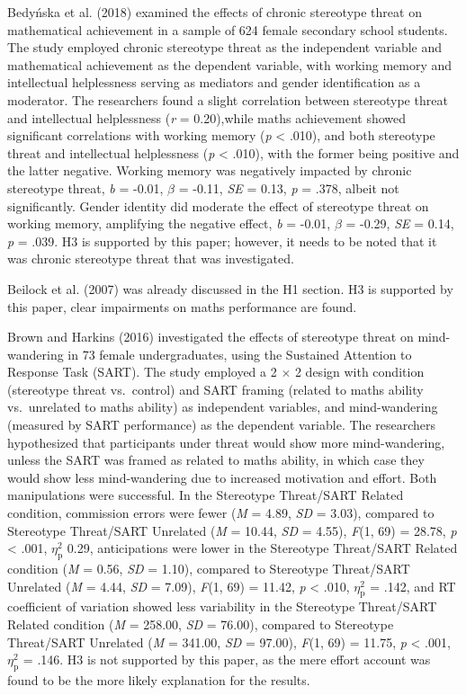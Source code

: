 \documentclass[
  stu, a4paper,floatsintext]{apa7}
\begin{document}
Bedyńska et al. (2018) examined the effects of chronic stereotype threat on mathematical achievement in a sample of 624 female secondary school students.
The study employed chronic stereotype threat as the independent variable and mathematical achievement as the dependent variable, with working memory and intellectual helplessness serving as mediators and gender identification as a moderator.
The researchers found a slight correlation between stereotype threat and intellectual helplessness (\emph{r} = 0.20),while maths achievement showed significant correlations with working memory (\emph{p} \textless{} .010), and both stereotype threat and intellectual helplessness (\emph{p} \textless{} .010), with the former being positive and the latter negative.
Working memory was negatively impacted by chronic stereotype threat, \emph{b} = -0.01, \(\beta\) = -0.11, \emph{SE} = 0.13, \emph{p} = .378, albeit not significantly.
Gender identity did moderate the effect of stereotype threat on working memory, amplifying the negative effect, \emph{b} = -0.01, \(\beta\) = -0.29, \emph{SE} = 0.14, \emph{p} = .039.
H3 is supported by this paper; however, it needs to be noted that it was chronic stereotype threat that was investigated.

Beilock et al. (2007) was already discussed in the H1 section.
H3 is supported by this paper, clear impairments on maths performance are found.

Brown and Harkins (2016) investigated the effects of stereotype threat on mind-wandering in 73 female undergraduates, using the Sustained Attention to Response Task (SART).
The study employed a 2 \(\times\) 2 design with condition (stereotype threat vs.~control) and SART framing (related to maths ability vs.~unrelated to maths ability) as independent variables, and mind-wandering (measured by SART performance) as the dependent variable. The researchers hypothesized that participants under threat would show more mind-wandering, unless the SART was framed as related to maths ability, in which case they would show less mind-wandering due to increased motivation and effort.
Both manipulations were successful.
In the Stereotype Threat/SART Related condition, commission errors were fewer (\emph{M} = 4.89, \emph{SD} = 3.03), compared to Stereotype Threat/SART Unrelated (\emph{M} = 10.44, \emph{SD} = 4.55), \emph{F}(1, 69) = 28.78, \emph{p} \textless{} .001, \(\eta^{2}_{\text{p}}\) 0.29, anticipations were lower in the Stereotype Threat/SART Related condition (\emph{M} = 0.56, \emph{SD} = 1.10), compared to Stereotype Threat/SART Unrelated (\emph{M} = 4.44, \emph{SD} = 7.09), \emph{F}(1, 69) = 11.42, \emph{p} \textless{} .010, \(\eta^{2}_{\text{p}}\) = .142, and RT coefficient of variation showed less variability in the Stereotype Threat/SART Related condition (\emph{M} = 258.00, \emph{SD} = 76.00), compared to Stereotype Threat/SART Unrelated (\emph{M} = 341.00, \emph{SD} = 97.00), \emph{F}(1, 69) = 11.75, \emph{p} \textless{} .001, \(\eta^{2}_{\text{p}}\) = .146.
H3 is not supported by this paper, as the mere effort account was found to be the more likely explanation for the results.
\end{document}
